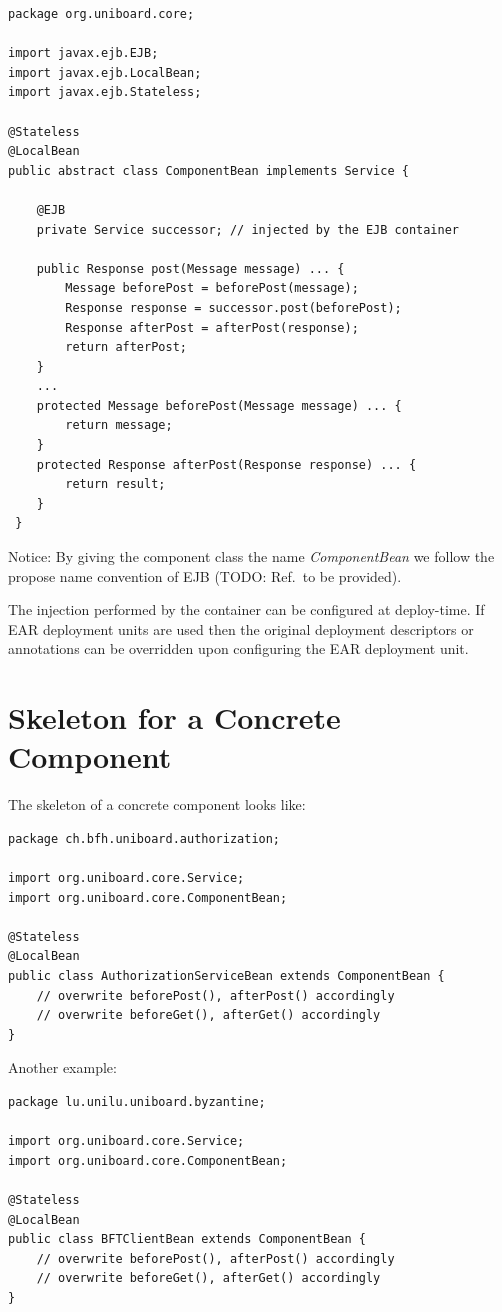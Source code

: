\documentclass[oneside]{scrreprt}
\begin{document}
\begin{lstlisting}
package org.uniboard.core;

import javax.ejb.EJB;
import javax.ejb.LocalBean;
import javax.ejb.Stateless;

@Stateless
@LocalBean
public abstract class ComponentBean implements Service {

    @EJB
    private Service successor; // injected by the EJB container

    public Response post(Message message) ... {
        Message beforePost = beforePost(message);
        Response response = successor.post(beforePost);
        Response afterPost = afterPost(response);
        return afterPost;
    }
    ...
    protected Message beforePost(Message message) ... {
        return message;
    }
    protected Response afterPost(Response response) ... {
        return result;
    }
 }
\end{lstlisting}

Notice: By giving the component class the name \emph{ComponentBean}
we follow the propose name convention of EJB (TODO: Ref.\ to be
provided).

The injection performed by the container can be configured at
deploy-time. If EAR deployment units are used then the original
deployment descriptors or annotations can be overridden upon
configuring the EAR deployment unit.


\section{Skeleton for a Concrete Component}

The skeleton of a concrete component looks like:

\begin{lstlisting}
package ch.bfh.uniboard.authorization;

import org.uniboard.core.Service;
import org.uniboard.core.ComponentBean;

@Stateless
@LocalBean
public class AuthorizationServiceBean extends ComponentBean {
    // overwrite beforePost(), afterPost() accordingly
    // overwrite beforeGet(), afterGet() accordingly
}
\end{lstlisting}

Another example:

\begin{lstlisting}
package lu.unilu.uniboard.byzantine;

import org.uniboard.core.Service;
import org.uniboard.core.ComponentBean;

@Stateless
@LocalBean
public class BFTClientBean extends ComponentBean {
    // overwrite beforePost(), afterPost() accordingly
    // overwrite beforeGet(), afterGet() accordingly
}
\end{lstlisting}
\end{document}
